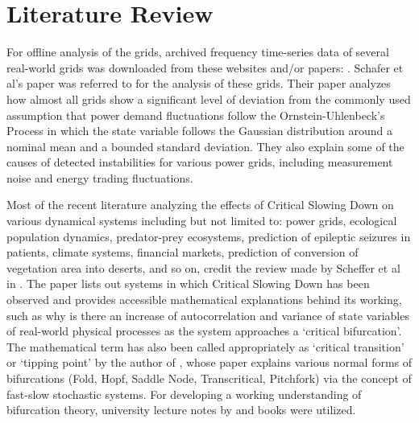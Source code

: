 \section[Literature Review]{Literature Review}
\label{sec:litt}

For offline analysis of the grids, archived frequency time-series data of several real-world grids was downloaded from these websites and/or papers: \cite{lrydin01, lrydinGithub, tokyo2017, tokyo2020, nordic2018, nordic2019, ce2019, ce2020,  ukNationalGridESOData}. Schafer et al's paper \cite{schafer01} was referred to for the analysis of these grids. Their paper  analyzes how almost all grids show a significant level of deviation from the commonly used assumption that power demand fluctuations follow the Ornstein-Uhlenbeck's Process in which the state variable follows the Gaussian distribution around a nominal mean and a bounded standard deviation. They also explain some of the causes of detected instabilities for various power grids, including measurement noise and energy trading fluctuations.

Most of the recent literature analyzing the effects of Critical Slowing Down on various dynamical systems including but not limited to: power grids, ecological population dynamics, predator-prey ecosystems, prediction of epileptic seizures in patients, climate systems, financial markets, prediction of conversion of vegetation area into deserts, and so on, credit the review made by Scheffer et al in \cite{schefferEarlyWarningSignalsForCriticalTransitions}. The paper lists out systems in which Critical Slowing Down has been observed and provides accessible mathematical explanations behind its working, such as why is there an increase of autocorrelation and variance of state variables of real-world physical processes as the system approaches a `critical bifurcation'. The mathematical term has also been called appropriately as `critical transition' or `tipping point' by the author of \cite{kuehnMathematicalFrameworkForCriticalTransitions}, whose paper explains various normal forms of bifurcations (Fold, Hopf, Saddle Node, Transcritical, Pitchfork) via the concept of fast-slow stochastic systems. For developing a working understanding of bifurcation theory, university lecture notes by \cite{nathanKutzNotesOnBifurcationTheoryAndNormalForms} and books \cite{chenBifurcationsAndChaosInEngineering, mohlerDyanmicsAndControlPartOne} were utilized.  

